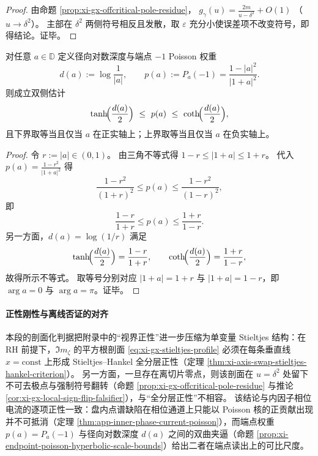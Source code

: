 \begin{proof}
由命题 \ref{prop:xi-gx-offcritical-pole-residue}，
\(
g_{\gamma}(u)=\frac{2m}{u-\delta^2}+O(1)
\)
（\(u\to\delta^2\)）。
主部在 \(\delta^2\) 两侧符号相反且发散，取 \(\varepsilon\) 充分小使误差项不改变符号，即得结论。证毕。
\end{proof}


\begin{proposition}\label{prop:xi-endpoint-poisson-hyperbolic-scale-bounds}
对任意 \(a\in\mathbb{D}\) 定义径向对数深度与端点 \(-1\) Poisson 权重
\[
d(a):=\log\frac1{|a|},\qquad
p(a):=P_a(-1)=\frac{1-|a|^2}{|1+a|^2}.
\]
则成立双侧估计
\[
\tanh\!\Bigl(\frac{d(a)}{2}\Bigr)\ \le\ p(a)\ \le\ \coth\!\Bigl(\frac{d(a)}{2}\Bigr),
\]
且下界取等当且仅当 \(a\) 在正实轴上；上界取等当且仅当 \(a\) 在负实轴上。
\end{proposition}

\begin{proof}
令 \(r:=|a|\in(0,1)\)。
由三角不等式得
\(
1-r\le |1+a|\le 1+r
\)。
代入 \(p(a)=\frac{1-r^2}{|1+a|^2}\) 得
\[
\frac{1-r^2}{(1+r)^2}\le p(a)\le \frac{1-r^2}{(1-r)^2},
\]
即
\[
\frac{1-r}{1+r}\le p(a)\le \frac{1+r}{1-r}.
\]
另一方面，\(d(a)=\log(1/r)\) 满足
\[
\tanh\!\Bigl(\frac{d(a)}{2}\Bigr)=\frac{1-r}{1+r},\qquad
\coth\!\Bigl(\frac{d(a)}{2}\Bigr)=\frac{1+r}{1-r},
\]
故得所示不等式。
取等号分别对应 \(|1+a|=1+r\) 与 \(|1+a|=1-r\)，即 \(\arg a=0\) 与 \(\arg a=\pi\)。证毕。
\end{proof}

\paragraph{正性刚性与离线否证的对齐}
本段的剖面化判据把附录中的“视界正性”进一步压缩为单变量 Stieltjes 结构：在 RH 前提下，\(\Im m_{\zeta}\) 的平方根剖面 \eqref{eq:xi-gx-stieltjes-profile} 必须在每条垂直线 \(x=\mathrm{const}\) 上形成 Stieltjes--Hankel 全分层正性（定理 \ref{thm:xi-axis-swap-stieltjes-hankel-criterion}）。
另一方面，一旦存在离切片零点，则该剖面在 \(u=\delta^2\) 处留下不可去极点与强制符号翻转（命题 \ref{prop:xi-gx-offcritical-pole-residue} 与推论 \ref{cor:xi-gx-local-sign-flip-falsifier}），与“全分层正性”不相容。
该结论与内因子相位电流的逐项正性一致：盘内点谱缺陷在相位通道上只能以 Poisson 核的正贡献出现并不可抵消（定理 \ref{thm:app-inner-phase-current-poisson}），而端点权重 \(p(a)=P_a(-1)\) 与径向对数深度 \(d(a)\) 之间的双曲夹逼（命题 \ref{prop:xi-endpoint-poisson-hyperbolic-scale-bounds}）给出二者在端点读出上的可比尺度。

\endinput
